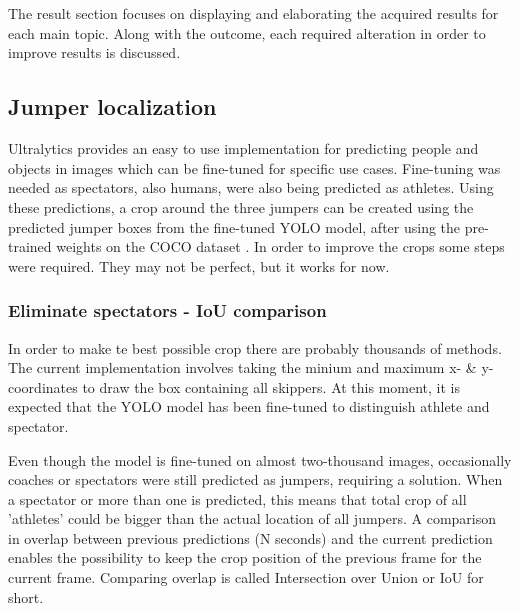 
\chapter{}%
\label{ch:results}

The result section focuses on displaying and elaborating the acquired results for each main topic. Along with the outcome, each required alteration in order to improve results is discussed.

\section{Jumper localization}

Ultralytics \autocite{Khanam2024} provides an easy to use implementation for predicting people and objects in images which can be fine-tuned for specific use cases. Fine-tuning was needed as spectators, also humans, were also being predicted as athletes. Using these predictions, a crop around the three jumpers can be created using the predicted jumper boxes from the fine-tuned YOLO model, after using the pre-trained weights on the COCO dataset \autocite{Lin2014}. In order to improve the crops some steps were required. They may not be perfect, but it works for now.

\subsection{Eliminate spectators - IoU comparison}

In order to make te best possible crop there are probably thousands of methods. The current implementation involves taking the minium and maximum x- \& y-coordinates to draw the box containing all skippers.
At this moment, it is expected that the YOLO model has been fine-tuned to distinguish athlete and spectator.

Even though the model is fine-tuned on almost two-thousand images, occasionally coaches or spectators were still predicted as jumpers, requiring a solution.
When a spectator or more than one is predicted, this means that total crop of all 'athletes' could be bigger than the actual location of all jumpers. A comparison in overlap between previous predictions (N seconds) and the current prediction enables the possibility to keep the crop position of the previous frame for the current frame. Comparing overlap is called Intersection over Union or IoU for short.

